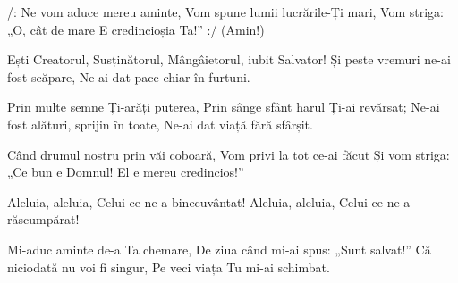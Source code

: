 \beginchorus
/: Ne vom aduce mereu aminte,
Vom spune lumii lucrările-Ți mari,
Vom striga: „O, cât de mare
E credincioșia Ta!” :/
(Amin!)
\endchorus

\beginverse
Ești Creatorul, Susținătorul,
Mângâietorul, iubit Salvator!
Și peste vremuri ne-ai fost scăpare,
Ne-ai dat pace chiar în furtuni.
\endverse

\beginverse
Prin multe semne Ți-arăți puterea,
Prin sânge sfânt harul Ți-ai revărsat;
Ne-ai fost alături, sprijin în toate,
Ne-ai dat viață fără sfârșit.
\endverse

\beginverse
Când drumul nostru prin văi coboară,
Vom privi la tot ce-ai făcut
Și vom striga: „Ce bun e Domnul!
El e mereu credincios!”
\endverse

\beginverse*
Aleluia, aleluia,
Celui ce ne-a binecuvântat!
Aleluia, aleluia,
Celui ce ne-a răscumpărat!
\endverse

\beginverse
Mi-aduc aminte de-a Ta chemare,
De ziua când mi-ai spus: „Sunt salvat!”
Că niciodată nu voi fi singur,
Pe veci viața Tu mi-ai schimbat.
\endverse
\endsong